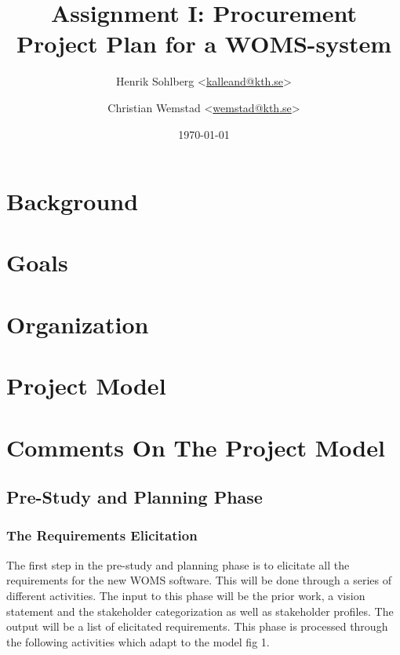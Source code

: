 \documentclass[a4paper]{article}
\title{Assignment I: Procurement Project Plan for a WOMS-system}
\author{Henrik Sohlberg <\href{mailto:hsoh@kth.se}{kalleand@kth.se}> %
\and Christian Wemstad <\href{mailto:wemstad@kth.se}{wemstad@kth.se}> %
}
\date{\today}
\begin{document}
\maketitle

\newpage
          
\tableofcontents
\newpage
\section{Background}
\label{sec:background}
 
\section{Goals} 
\label{sec:goals}


\section{Organization}
\label{sec:organization}


\section{Project Model} 
\label{sec:project_model}


\section{Comments On The Project Model} 
\label{sec:comments_on_the_project_model}

\subsection{Pre-Study and Planning Phase}
\label{sub:pre_study_and_planning_phase}

\subsubsection{The Requirements Elicitation}
\label{subsub:the_requirements_elicitation}

The first step in the pre-study and planning phase is to elicitate all the requirements for the new WOMS software. This will be done through a series of different activities. The input to this phase will be the prior work, a vision statement and the stakeholder categorization as well as stakeholder profiles. The output will be a list of elicitated requirements. This phase is processed through the following activities which adapt to the model fig 1. %
\end{document}
